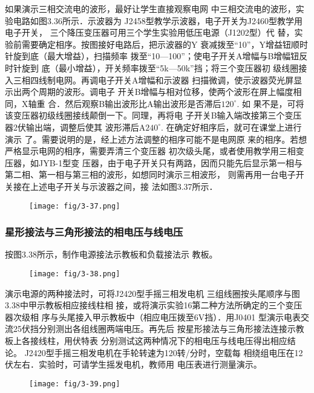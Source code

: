 如果演示三相交流电的波形，最好让学生直接观察电网
中三相交流电的波形，实验电路如图3.36所示．示波器为
J2458型教学示波器，电子开关为J2460型教学用电子开关，
三个降压变压器可用三个学生实验用低压电源（J1202型）代
替，实验前需要确定相序。按图接好电路后，把示波器的Y
衰减拨至“10”，Y增益钮顺时针旋到底（最大增益），扫描频率
拨至“10—100”；使电子开关A增幅与B增幅钮反时针旋到
底（最小增益），开关频率拨至“5k—50k”挡；将三个变压器初
级线圈接入三相四线制电网。再调电子开关A增幅和示波器
扫描微调，使示波器荧光屏显示出两个周期的波形。调电子
开关B增幅与相对位移，使两个波形在屏上幅度相同，X轴重
合．然后观察B输出波形比A输出波形是否滞后$120^{\circ}$. 如
果不是，可将该变压器初级线圈接线颠倒一下。同理，再将电
子开关B输入端改接第三个变压器2伏输出端，调整后使其
波形滞后A$240^{\circ}$. 在确定好相序后，就可在课堂上进行演示
了。需要说明的是，经上述方法调整的相序可能不是电网原
来的相序。若想严格显示电网的相序，需要弄清三个变压器
初次级头尾，或者使用教学用三相变压器，如JYB-1型变
压器，由于电子开关只有两路，因而只能先后显示第一相与
第二相、第一相与第三相的波形，如想同时演示三相波形，
则需再用一台电子开关接在上述电子开关与示波器之间，接
法如图3.37所示．
\begin{figure}[htp]
    \centering
\texttt{[image: fig/3-37.png]}
    \caption{}
\end{figure}

\subsubsection{星形接法与三角形接法的相电压与线电压}
按图3.38所示，制作电源接法示教板和负载接法示
教板。
\begin{figure}[htp]
    \centering
\texttt{[image: fig/3-38.png]}
    \caption{}
\end{figure}

演示电源的两种接法时，可将J2420型手摇三相发电机
三组线圈按头尾顺序与图3.38中甲示教板相应接线柱相
接，或将演示实验16第二种方法所确定的三个变压器次级相
序与头尾接入甲示教板中（相应电压拨至6V挡）．用J0401
型演示电表交流25伏挡分别测出各组线圈两端电压。再先后
按星形接法与三角形接法连接示教板上各接线柱，用伏特表
分别测试这两种情况下的相电压与线电压得出相应结论。
J2420型手摇三相发电机在手轮转速为120转/分时，空载每
相绕组电压在12伏左右．实验时，可请学生摇发电机，教师用
电压表进行测量演示。

\begin{figure}[htp]
    \centering
\texttt{[image: fig/3-39.png]}
    \caption{}
\end{figure}

